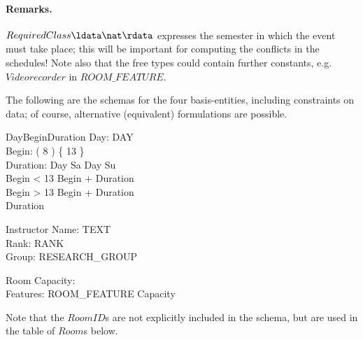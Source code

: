 \documentclass[a4paper]{article}
\begin{document}
\paragraph{Remarks.} $RequiredClass \ldata \nat \rdata$ expresses the
semester in which the event must take place; this will be important for
computing the conflicts in the schedules!  Note also that the free types could
contain further constants, e.g.~$Videorecorder$ in $ROOM\_FEATURE$.

The following are the schemas for the four basis-entities, including constraints
on data; of course, alternative (equivalent) formulations are possible.
\begin{schema}{DayBeginDuration}
  Day: DAY \\
  Begin: ( 8  ) \setminus \{ 13 \} \\
  Duration: \nat
  \where
  Day \neq Sa \land Day \neq Su \\
  Begin < 13 \implies Begin + Duration  \\
  Begin > 13 \implies Begin + Duration  \\
  Duration 
\end{schema}
\begin{schema}{Instructor}
  Name: TEXT  \\
  Rank: RANK \\
  Group: RESEARCH\_GROUP
\end{schema}
\begin{schema}{Room}
  Capacity: \nat  \\
  Features: \power ROOM\_FEATURE 
  \where
  Capacity 
\end{schema}

\noindent
Note that the $RoomID$s are not explicitly included in the schema, but
are used in the table of $Room$s below.
\end{document}
